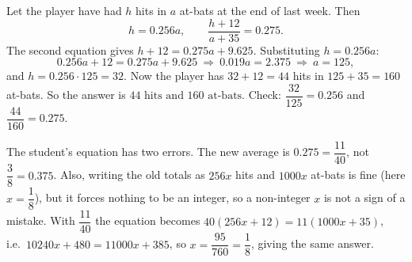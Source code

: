 Let the player have had $h$ hits in $a$ at-bats at the end of last week. Then
\[
h=0.256a,\qquad \dfrac{h+12}{a+35}=0.275 .
\]
The second equation gives $h+12=0.275a+9.625$. Substituting $h=0.256a$:
\[
0.256a+12=0.275a+9.625\ \Longrightarrow\ 0.019a=2.375\ \Longrightarrow\ a=125,
\]
and $h=0.256\cdot125=32$. Now the player has $32+12=44$ hits in $125+35=160$ at-bats. So the answer is $\boxed{44\text{ hits and }160\text{ at-bats}}$. Check: $\dfrac{32}{125}=0.256$ and $\dfrac{44}{160}=0.275$.

The student's equation has two errors. The new average is $0.275=\dfrac{11}{40}$, not $\dfrac{3}{8}=0.375$. Also, writing the old totals as $256x$ hits and $1000x$ at-bats is fine (here $x=\dfrac{1}{8}$), but it forces nothing to be an integer, so a non-integer $x$ is not a sign of a mistake. With $\dfrac{11}{40}$ the equation becomes $40(256x+12)=11(1000x+35)$, i.e.\ $10240x+480=11000x+385$, so $x=\dfrac{95}{760}=\dfrac{1}{8}$, giving the same answer.
